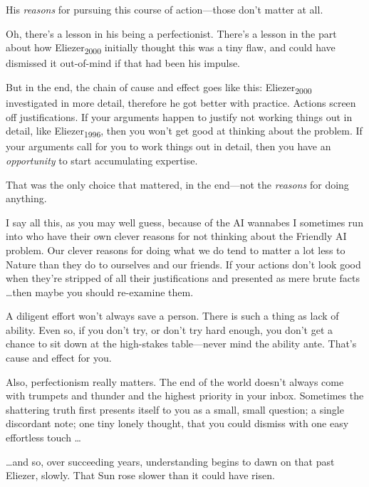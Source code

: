 {
 His \textit{reasons} for pursuing this course of action---those
don't matter at all.}

{
 Oh, there's a lesson in his being a perfectionist.
There's a lesson in the part about how
Eliezer\textsubscript{2000} initially thought this was a tiny flaw, and
could have dismissed it out-of-mind if that had been his impulse.}

{
 But in the end, the chain of cause and effect goes like this:
Eliezer\textsubscript{2000} investigated in more detail, therefore he
got better with practice. Actions screen off justifications. If your
arguments happen to justify not working things out in detail, like
Eliezer\textsubscript{1996}, then you won't get good at
thinking about the problem. If your arguments call for you to work
things out in detail, then you have an \textit{opportunity} to start
accumulating expertise.}

{
 That was the only choice that mattered, in the end---not the
\textit{reasons} for doing anything.}

{
 I say all this, as you may well guess, because of the AI wannabes
I sometimes run into who have their own clever reasons for not thinking
about the Friendly AI problem. Our clever reasons for doing what we do
tend to matter a lot less to Nature than they do to ourselves and our
friends. If your actions don't look good when
they're stripped of all their justifications and
presented as mere brute facts \ldots then maybe you should re-examine
them.}

{
 A diligent effort won't always save a person.
There is such a thing as lack of ability. Even so, if you
don't try, or don't try hard enough,
you don't get a chance to sit down at the high-stakes
table---never mind the ability ante. That's cause and
effect for you.}

{
 Also, perfectionism really matters. The end of the world
doesn't always come with trumpets and thunder and the
highest priority in your inbox. Sometimes the shattering truth first
presents itself to you as a small, small question; a single discordant
note; one tiny lonely thought, that you could dismiss with one easy
effortless touch \ldots}

{
 \ldots and so, over succeeding years, understanding begins to dawn
on that past Eliezer, slowly. That Sun rose slower than it could have
risen.}

\myendsectiontext


